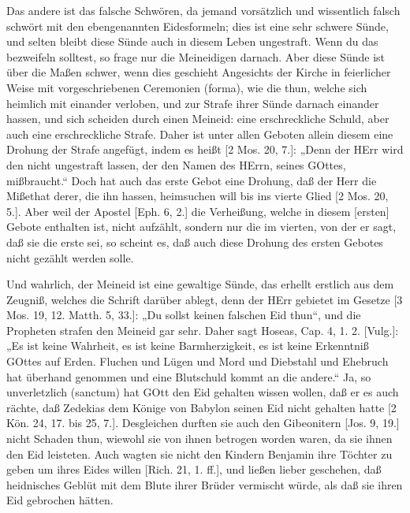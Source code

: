 Das andere ist das falsche Schwören, da jemand vorsätzlich und wissentlich falsch schwört mit den ebengenannten Eidesformeln; dies ist eine sehr schwere Sünde, und selten bleibt diese Sünde auch in diesem Leben ungestraft. Wenn du das bezweifeln solltest, so frage nur die Meineidigen darnach. Aber diese Sünde ist über die
Maßen schwer, wenn dies geschieht Angesichts der Kirche in feierlicher Weise mit vorgeschriebenen Ceremonien (forma), wie die thun, welche sich heimlich mit einander verloben, und zur Strafe ihrer Sünde darnach einander hassen, und sich scheiden durch einen Meineid: eine erschreckliche Schuld, aber auch eine erschreckliche Strafe. Daher ist unter allen Geboten allein diesem eine Drohung der Strafe angefügt, indem es heißt [2 Mos. 20, 7.]: „Denn der HErr wird den nicht ungestraft lassen, der den Namen des HErrn, seines GOttes, mißbraucht.“ Doch hat auch das erste Gebot eine Drohung, daß der Herr die Mißethat derer, die ihn hassen, heimsuchen will bis ins vierte Glied [2 Mos. 20, 5.]. Aber weil der Apostel [Eph. 6, 2.] die Verheißung, welche in diesem [ersten] Gebote enthalten ist, nicht aufzählt, sondern nur die im vierten, von der er sagt, daß sie die erste sei, so scheint es, daß auch diese Drohung des ersten Gebotes nicht gezählt werden solle.

Und wahrlich, der Meineid ist eine gewaltige Sünde, das erhellt erstlich aus dem Zeugniß, welches die Schrift darüber ablegt, denn der HErr gebietet im Gesetze [3 Mos. 19, 12. Matth. 5, 33.]: „Du sollst keinen falschen Eid thun“, und die Propheten strafen den Meineid gar sehr. Daher sagt Hoseas, Cap. 4, 1. 2. [Vulg.]: „Es ist keine Wahrheit, es ist keine Barmherzigkeit, es ist keine Erkenntniß GOttes auf Erden. Fluchen und Lügen und Mord und Diebstahl und Ehebruch hat überhand genommen und eine Blutschuld kommt an die andere.“ Ja, so unverletzlich (sanctum) hat GOtt den Eid gehalten wissen wollen, daß er es auch rächte, daß Zedekias dem Könige von Babylon seinen Eid nicht gehalten hatte [2 Kön. 24, 17. bis 25, 7.]. Desgleichen durften sie auch den Gibeonitern [Jos. 9, 19.] nicht Schaden thun, wiewohl sie von ihnen betrogen worden waren, da sie ihnen den Eid leisteten. Auch wagten sie nicht den Kindern Benjamin ihre Töchter zu geben um ihres Eides willen [Rich. 21, 1. ff.], und ließen lieber geschehen, daß heidnisches Geblüt mit dem Blute ihrer Brüder vermischt würde, als daß sie ihren Eid gebrochen hätten.

